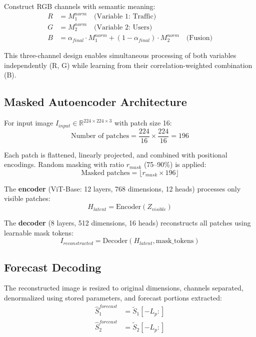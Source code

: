 \documentclass[preprint,12pt,authoryear]{elsarticle}
\begin{document}
Construct RGB channels with semantic meaning:
\begin{align}
    R &= M_1^{norm} \quad \text{(Variable 1: Traffic)} \\
    G &= M_2^{norm} \quad \text{(Variable 2: Users)} \\
    B &= \alpha_{final} \cdot M_1^{norm} + (1 - \alpha_{final}) \cdot M_2^{norm} \quad \text{(Fusion)}
\end{align}

This three-channel design enables simultaneous processing of both variables independently (R, G) while learning from their correlation-weighted combination (B).

\subsection{Masked Autoencoder Architecture}

For input image $I_{input} \in \mathbb{R}^{224 \times 224 \times 3}$ with patch size 16:
\begin{equation}
    \text{Number of patches} = \frac{224}{16} \times \frac{224}{16} = 196
\end{equation}

Each patch is flattened, linearly projected, and combined with positional encodings. Random masking with ratio $r_{mask}$ (75--90\%) is applied:
\begin{equation}
    \text{Masked patches} = \lfloor r_{mask} \times 196 \rfloor
\end{equation}

The \textbf{encoder} (ViT-Base: 12 layers, 768 dimensions, 12 heads) processes only visible patches:
\begin{equation}
    H_{latent} = \text{Encoder}(Z_{visible})
\end{equation}

The \textbf{decoder} (8 layers, 512 dimensions, 16 heads) reconstructs all patches using learnable mask tokens:
\begin{equation}
    I_{reconstructed} = \text{Decoder}(H_{latent}, \text{mask\_tokens})
\end{equation}

\subsection{Forecast Decoding}

The reconstructed image is resized to original dimensions, channels separated, denormalized using stored parameters, and forecast portions extracted:
\begin{align}
    \hat{S}_1^{forecast} &= \tilde{S}_1[-L_p:] \\
    \hat{S}_2^{forecast} &= \tilde{S}_2[-L_p:]
\end{align}
\end{document}
